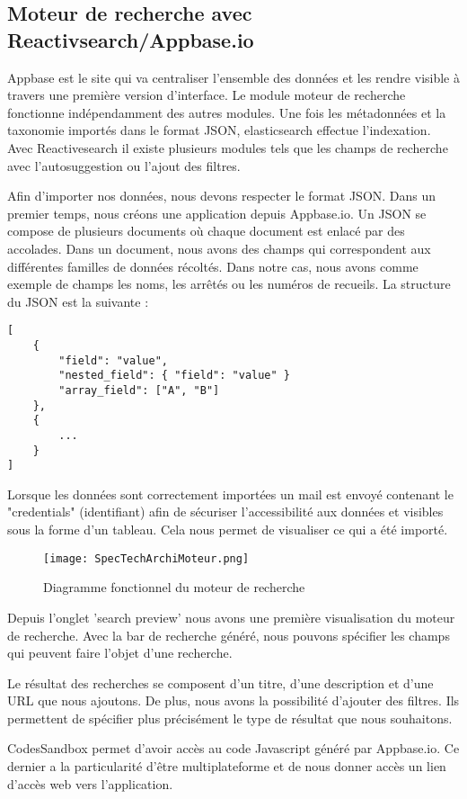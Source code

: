 \subsection{Moteur de recherche avec Reactivsearch/Appbase.io}
Appbase est le site qui va centraliser l'ensemble des données et les rendre visible à travers une première version d'interface.
Le module moteur de recherche fonctionne indépendamment des autres modules. Une fois les métadonnées et la taxonomie importés dans le format JSON, elasticsearch effectue l'indexation. Avec Reactivesearch il existe plusieurs modules tels que les champs de recherche avec l'autosuggestion ou l'ajout des filtres.  

Afin d'importer nos données, nous devons respecter le format JSON.
Dans un premier temps, nous créons une application depuis Appbase.io. 
Un JSON se compose de plusieurs documents où chaque document est enlacé par des accolades. Dans un document, nous avons des champs qui correspondent aux différentes familles de données récoltés. Dans notre cas, nous avons comme exemple de champs les noms, les arrêtés ou les numéros de recueils. La structure du JSON est la suivante :

\begin{lstlisting}
[
	{
		"field": "value",
		"nested_field": { "field": "value" }
		"array_field": ["A", "B"]
	},
	{
		...
	}
]
\end{lstlisting}

Lorsque les données sont correctement importées un mail est envoyé contenant le "credentials" (identifiant) afin de sécuriser l'accessibilité aux données et visibles sous la forme d'un tableau. Cela nous permet de visualiser ce qui a été importé. 

\begin{figure}[h!]
  \centering
	\texttt{[image: SpecTechArchiMoteur.png]}
	\caption[]{Diagramme fonctionnel du moteur de recherche}
  \label{}
\end{figure}

Depuis l'onglet 'search preview' nous avons une première visualisation du moteur de recherche. Avec la bar de recherche généré, nous pouvons spécifier les champs qui peuvent faire l'objet d'une recherche. 

Le résultat des recherches se composent d’un titre, d’une description et d’une URL que nous ajoutons. De plus, nous avons la possibilité d’ajouter des filtres. Ils permettent de spécifier plus précisément le type de résultat que nous souhaitons.

CodesSandbox permet d’avoir accès au code Javascript généré par Appbase.io. Ce dernier a la particularité d’être multiplateforme et de nous donner accès un lien d’accès web vers l'application.
